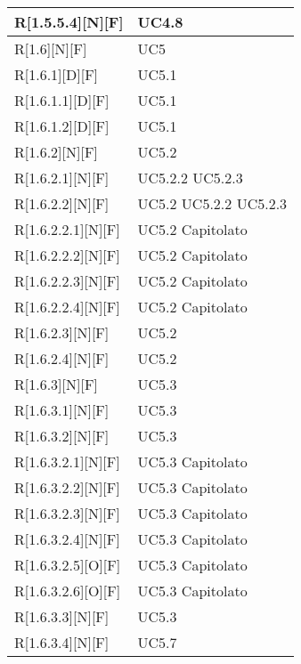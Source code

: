 \begin{longtable}{X | X}
\hline
R[1.5.5.4][N][F] & UC4.8 \\
\hline
R[1.6][N][F] & UC5 \\
\hline
R[1.6.1][D][F] & UC5.1 \\
\hline
R[1.6.1.1][D][F] & UC5.1 \\
\hline
R[1.6.1.2][D][F] & UC5.1 \\
\hline
R[1.6.2][N][F] & UC5.2 \\
\hline
R[1.6.2.1][N][F] & UC5.2.2 \newline UC5.2.3 \\
\hline
R[1.6.2.2][N][F] & UC5.2 \newline UC5.2.2 \newline UC5.2.3 \\
\hline
R[1.6.2.2.1][N][F] & UC5.2 \newline Capitolato \\
\hline
R[1.6.2.2.2][N][F] & UC5.2 \newline Capitolato \\
\hline
R[1.6.2.2.3][N][F] & UC5.2 \newline Capitolato \\
\hline
R[1.6.2.2.4][N][F] & UC5.2 \newline Capitolato \\
\hline
R[1.6.2.3][N][F] & UC5.2 \\
\hline
R[1.6.2.4][N][F] & UC5.2 \\
\hline
R[1.6.3][N][F] & UC5.3 \\
\hline
R[1.6.3.1][N][F] & UC5.3 \\
\hline
R[1.6.3.2][N][F] & UC5.3 \\
\hline
R[1.6.3.2.1][N][F] & UC5.3 \newline Capitolato \\
\hline
R[1.6.3.2.2][N][F] & UC5.3 \newline Capitolato \\
\hline
R[1.6.3.2.3][N][F] & UC5.3 \newline Capitolato \\
\hline
R[1.6.3.2.4][N][F] & UC5.3 \newline Capitolato \\
\hline
R[1.6.3.2.5][O][F] & UC5.3 \newline Capitolato \\
\hline
R[1.6.3.2.6][O][F] & UC5.3 \newline Capitolato \\
\hline
R[1.6.3.3][N][F] & UC5.3 \\
\hline
R[1.6.3.4][N][F] & UC5.7 \\

\end{longtable}
